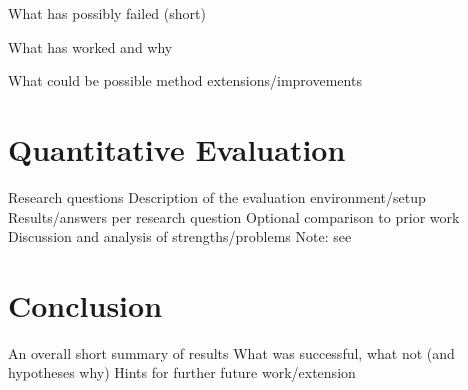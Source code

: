 \documentclass[
     12pt,                    %
     a4paper,             %
     BCOR10mm,     %
     DIV14,                 %
     listof=totoc,                    %
     bibliography=totoc,       %
     index=totoc,              %
     twoside,
     headsepline
     ]{scrreprt}
\begin{document}
What has possibly failed (short)

What has worked and why

What could be possible method extensions/improvements



\chapter{Quantitative Evaluation}
Research questions
Description of the evaluation environment/setup
Results/answers per research question
Optional comparison to prior work
Discussion and analysis of strengths/problems
Note: see 



\chapter{Conclusion}
An overall short summary of results
What was successful, what not (and hypotheses why)
Hints for further future work/extension

\clearpage



\end{document}
